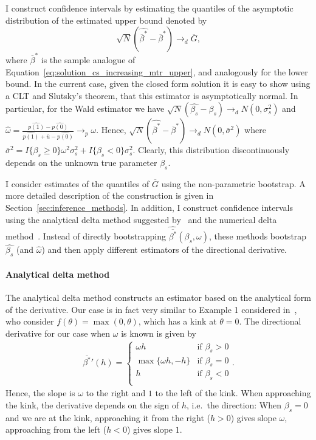 \documentclass[12pt,a4paper,english]{article} %
\numberwithin{equation}{section}
\theoremstyle{definition}
\theoremstyle{remark}
\theoremstyle{plain}
\begin{document}
I construct confidence intervals by estimating the quantiles of the asymptotic distribution of the estimated upper bound denoted by
\begin{equation}
  \sqrt{N}(\hat{\overline{\beta}^*} - \overline{\beta}^*) \to_d \overline{G},
\end{equation}
where $\overline{\beta}^*$ is the sample analogue of Equation~\ref{eq:solution_cs_increasing_mtr_upper}, and analogously for the lower bound.
In the current case, given the closed form solution it is easy to show using a CLT and Slutsky's theorem, that this estimator is asymptotically normal.
In particular, for the Wald estimator we have $\sqrt{N}(\hat{\beta_s} - \beta_s) \to_d N(0, \sigma^2_s)$ and $\hat{\omega} = \frac{\hat{p(1)} - \hat{p(0)}}{\hat{p(1)} + \overline{u} - \hat{p(0)}} \to_p \omega$.
Hence, $\sqrt{N}(\hat{\overline{\beta}^*} - \overline{\beta}^*) \to_d N(0, \overline{\sigma}^2)$ where $\overline{\sigma}^2 = I\{\beta_s \geq 0\}\omega^2\sigma^2_s + I\{\beta_s < 0\}\sigma^2_s$.
Clearly, this distribution discontinuously depends on the unknown true parameter $\beta_s$.

I consider estimates of the quantiles of $\overline{G}$ using the non-parametric bootstrap.
A more detailed description of the construction is given in Section~\ref{sec:inference_methods}.
In addition, I construct confidence intervals using the analytical delta method suggested by~\cite{fang2019infdirdiff} and the numerical delta method~\cite{hong2018numerical}.
Instead of directly bootstrapping $\hat{\overline{\beta^*}}(\beta_s, \omega)$, these methods bootstrap $\hat{\beta_s}$ (and $\hat{\omega}$) and then apply different estimators of the directional derivative.

\paragraph{Analytical delta method} The analytical delta method constructs an estimator based on the analytical form of the derivative.
Our case is in fact very similar to Example 1 considered in~\cite{fang2019infdirdiff}, who consider $f(\theta) = \max(0, \theta)$, which has a kink at $\theta=0$.
The directional derivative for our case when $\omega$ is known is given by
\begin{align}
  \overline{\beta^*}'(h) =
  \begin{cases}
    \omega h  &\text{if } \beta_s > 0 \\
    \max\{\omega h, -h\} & \text{if } \beta_s = 0 \\
    h         & \text{if } \beta_s < 0\\
  \end{cases}.
\end{align}
Hence, the slope is $\omega$ to the right and $1$ to the left of the kink.
When approaching the kink, the derivative depends on the sign of $h$, i.e.\ the direction:
When $\beta_s = 0$ and we are at the kink, approaching it from the right ($h>0$) gives slope $\omega$, approaching from the left ($h<0$) gives slope $1$.
\end{document}
